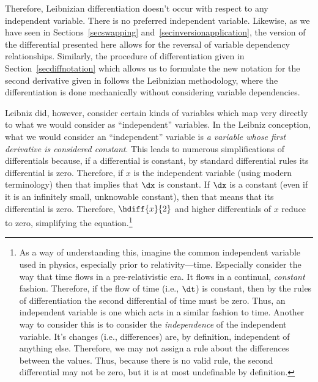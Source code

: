 Therefore, Leibnizian differentiation doesn't occur with respect to any independent variable.
There is no preferred independent variable.
Likewise, as we have seen in Sections~\ref{secswapping} and~\ref{secinversionapplication}, the version of the differential presented here allows for the reversal of variable dependency relationships.
Similarly, the procedure of differentiation given in Section~\ref{secdiffnotation} which allows us to formulate the new notation for the second derivative given in  follows the Leibnizian methodology, where the differentiation is done mechanically without considering variable dependencies.

Leibniz did, however, consider certain kinds of variables which map very directly to what we would consider as ``independent'' variables.
In the Leibniz conception, what we would consider an ``independent'' variable is \emph{a variable whose first derivative is considered constant}.
This leads to numerous simplifications of differentials because, if a differential is constant, by standard differential rules its differential is zero.
Therefore, if $x$ is the independent variable (using modern terminology) then that implies that $\dx$ is constant.
If $\dx$ is a constant (even if it is an infinitely small, unknowable constant), then that means that its differential is zero.
Therefore, $\hdiff{x}{2}$ and higher differentials of $x$ reduce to zero, simplifying the equation.\footnote{As a way of understanding this, imagine the common independent variable used in physics, especially prior to relativity---time.  
  Especially consider the way that time flows in a pre-relativistic era.  
  It flows in a continual, \emph{constant} fashion.  
  Therefore, if the flow of time (i.e., $\dt$) is constant, then by the rules of differentiation the second differential of time must be zero.  
  Thus, an independent variable is one which acts in a similar fashion to time.  
  Another way to consider this is to consider the \emph{independence} of the independent variable.  
  It's changes (i.e., differences) are, by definition, independent of anything else.   
  Therefore, we may not assign a rule about the differences between the values.  
  Thus, because there is no valid rule, the second differential may not be zero, but it is at most undefinable by definition.}

